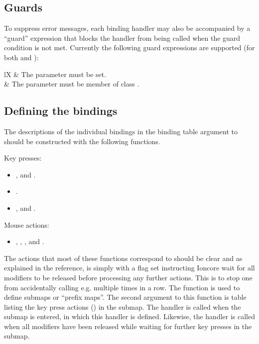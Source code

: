 \subsection{Guards}

To suppress error messages, each binding handler may also be accompanied
by a ``guard'' expression that blocks the handler from being called when
the guard condition is not met. Currently the following guard expressions
are supported (for both  and ):

\begin{tabularx}{\linewidth}{lX}
     & The  parameter must be set. \\
     & The  parameter must be member
      of class . \\
\end{tabularx}


\subsection{Defining the bindings}
\label{sec:binddef}

The descriptions of the individual bindings in the binding table argument
to  should be constructed with the following
functions.

Key presses:
\begin{itemize}
    \item {}, and
          .
    \item {}.
    \item {}, and
          .
\end{itemize}
Mouse actions:
\begin{itemize}
    \item {},
          ,
          , and
          .
\end{itemize}

The actions that most of these functions correspond to should be clear
and as explained in the reference,  is simply
 with a flag set instructing Ioncore wait for
all modifiers to be released before processing any further actions.
This is to stop one from accidentally calling e.g.
 multiple times in a row. The 
 function is used to define submaps or
``prefix maps''. The second argument to this function is table listing
the key press actions () in the submap. 
The  handler is called when the submap
is entered, in which this handler is defined. Likewise, the
 handler is  called when all modifiers
have been released while waiting for further key presses in the submap.


